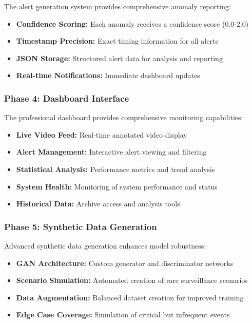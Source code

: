 \documentclass[12pt,a4paper]{article}
\begin{document}
The alert generation system provides comprehensive anomaly reporting:

\begin{itemize}
    \item \textbf{Confidence Scoring:} Each anomaly receives a confidence score (0.0-2.0)
    \item \textbf{Timestamp Precision:} Exact timing information for all alerts
    \item \textbf{JSON Storage:} Structured alert data for analysis and reporting
    \item \textbf{Real-time Notifications:} Immediate dashboard updates
\end{itemize}

\subsubsection{Phase 4: Dashboard Interface}

The professional dashboard provides comprehensive monitoring capabilities:

\begin{itemize}
    \item \textbf{Live Video Feed:} Real-time annotated video display
    \item \textbf{Alert Management:} Interactive alert viewing and filtering
    \item \textbf{Statistical Analysis:} Performance metrics and trend analysis
    \item \textbf{System Health:} Monitoring of system performance and status
    \item \textbf{Historical Data:} Archive access and analysis tools
\end{itemize}

\subsubsection{Phase 5: Synthetic Data Generation}

Advanced synthetic data generation enhances model robustness:

\begin{itemize}
    \item \textbf{GAN Architecture:} Custom generator and discriminator networks
    \item \textbf{Scenario Simulation:} Automated creation of rare surveillance scenarios
    \item \textbf{Data Augmentation:} Balanced dataset creation for improved training
    \item \textbf{Edge Case Coverage:} Simulation of critical but infrequent events
\end{itemize}
\end{document}
